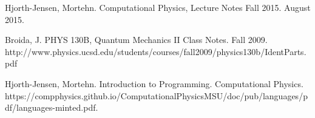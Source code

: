 \documentclass[%
oneside,                 %
final,                   %
10pt]{article}
\begin{document}

\begin{thebibliography}{9}

Hjorth-Jensen, Mortehn. 
Computational Physics, Lecture Notes Fall 2015. 
August 2015.


Broida, J.
PHYS 130B, Quantum Mechanics II Class Notes.
Fall 2009.
http://www.physics.ucsd.edu/students/courses/fall2009/physics130b/IdentParts.pdf

Hjorth-Jensen, Mortehn. 
Introduction to Programming. 
Computational Physics.
https://compphysics.github.io/ComputationalPhysicsMSU/doc/pub/languages/pdf/languages-minted.pdf.

\end{thebibliography}



\end{document}
